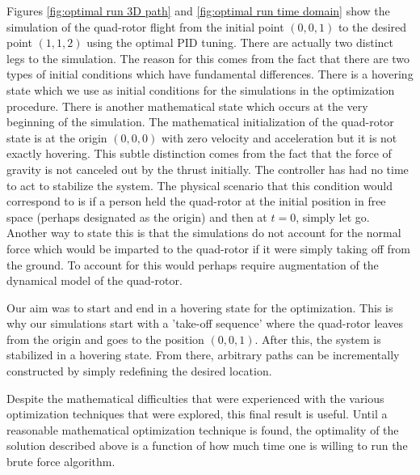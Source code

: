 Figures \ref{fig:optimal run 3D path} and \ref{fig:optimal run time domain} show the simulation of the quad-rotor flight from the initial point $(0,0,1)$ to the desired point $(1,1,2)$ using the optimal PID tuning. There are actually two distinct legs to the simulation. The reason for this comes from the fact that there are two types of initial conditions which have fundamental differences. There is a hovering state which we use as initial conditions for the simulations in the optimization procedure. There is another mathematical state which occurs at the very beginning of the simulation. The mathematical initialization of the quad-rotor state is at the origin $(0,0,0)$ with zero velocity and acceleration but it is not exactly hovering. This subtle distinction comes from the fact that the force of gravity is not canceled out by the thrust initially. The controller has had no time to act to stabilize the system. The physical scenario that this condition would correspond to is if a person held the quad-rotor at the initial position in free space (perhaps designated as the origin) and then at $t=0$, simply let go. Another way to state this is that the simulations do not account for the normal force which would be imparted to the quad-rotor if it were simply taking off from the ground. To account for this would perhaps require augmentation of the dynamical model of the quad-rotor.

Our aim was to start and end in a hovering state for the optimization. This is why our simulations start with a 'take-off sequence' where the quad-rotor leaves from the origin and goes to the position $(0,0,1)$. After this, the system is stabilized in a hovering state. From there, arbitrary paths can be incrementally constructed by simply redefining the desired location.

Despite the mathematical difficulties that were experienced with the various optimization techniques that were explored, this final result is useful. Until a reasonable mathematical optimization technique is found, the optimality of the solution described above is a function of how much time one is willing to run the brute force algorithm.































